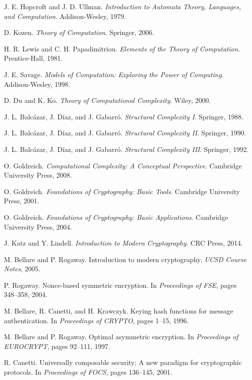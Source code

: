 \documentclass[11pt]{article}
\theoremstyle{definition}
\begin{document}
\begin{thebibliography}{99}
 J. E. Hopcroft and J. D. Ullman. \emph{Introduction to Automata Theory, Languages, and Computation}. Addison-Wesley, 1979.

 D. Kozen. \emph{Theory of Computation}. Springer, 2006.

 H. R. Lewis and C. H. Papadimitriou. \emph{Elements of the Theory of Computation}. Prentice-Hall, 1981.

 J. E. Savage. \emph{Models of Computation: Exploring the Power of Computing}. Addison-Wesley, 1998.

 D. Du and K. Ko. \emph{Theory of Computational Complexity}. Wiley, 2000.

 J. L. Balcázar, J. Díaz, and J. Gabarró. \emph{Structural Complexity I}. Springer, 1988.

 J. L. Balcázar, J. Díaz, and J. Gabarró. \emph{Structural Complexity II}. Springer, 1990.

 J. L. Balcázar, J. Díaz, and J. Gabarró. \emph{Structural Complexity III}. Springer, 1992.

 O. Goldreich. \emph{Computational Complexity: A Conceptual Perspective}. Cambridge University Press, 2008.

 O. Goldreich. \emph{Foundations of Cryptography: Basic Tools}. Cambridge University Press, 2001.

 O. Goldreich. \emph{Foundations of Cryptography: Basic Applications}. Cambridge University Press, 2004.

 J. Katz and Y. Lindell. \emph{Introduction to Modern Cryptography}. CRC Press, 2014.

 M. Bellare and P. Rogaway. Introduction to modern cryptography. \emph{UCSD Course Notes}, 2005.

 P. Rogaway. Nonce-based symmetric encryption. In \emph{Proceedings of FSE}, pages 348--358, 2004.

 M. Bellare, R. Canetti, and H. Krawczyk. Keying hash functions for message authentication. In \emph{Proceedings of CRYPTO}, pages 1--15, 1996.

 M. Bellare and P. Rogaway. Optimal asymmetric encryption. In \emph{Proceedings of EUROCRYPT}, pages 92--111, 1997.

 R. Canetti. Universally composable security: A new paradigm for cryptographic protocols. In \emph{Proceedings of FOCS}, pages 136--145, 2001.


\end{thebibliography}
\end{document}
